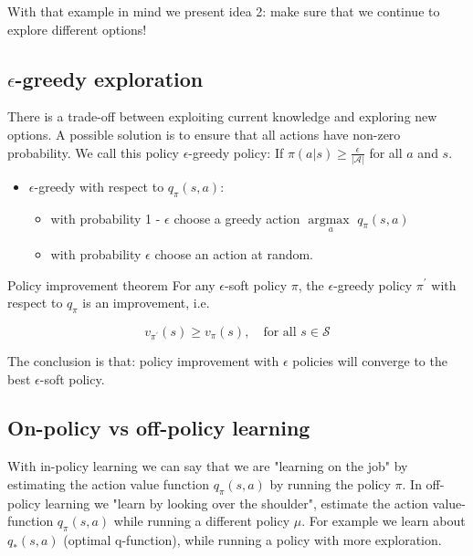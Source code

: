 With that example in mind we present idea 2: make sure that we continue to explore different options!

\subsection*{$\epsilon$-greedy exploration}
There is a trade-off between exploiting current knowledge and exploring new options. A possible solution is to ensure that all actions have non-zero probability. We call this policy $\epsilon$-greedy policy: If $\pi (a|s) \ge \frac{\epsilon} {|\mathcal{A}|} $ for all $a$ and $s$. 

\begin{itemize}
	\item $\epsilon$-greedy with respect to $q_\pi(s,a)$: 
	\begin{itemize}
		\item with probability 1 - $\epsilon$ choose a greedy action $\underset{a}{\arg \text{max }} q_\pi(s,a)$
		\item with probability $\epsilon$ choose an action at random.
	\end{itemize}
\end{itemize}

\begin{wbox}{Policy improvement theorem}
For any $\epsilon$-soft policy $\pi$, the $\epsilon$-greedy policy $\pi^{\prime}$ with respect to $q_\pi$ is an improvement, i.e.

	\begin{equation}
		v_{\pi^{\prime}}(s) \ge v_\pi(s), \quad \text{for all } s \in \mathcal{S}
	\end{equation}
\end{wbox}

The conclusion is that: policy improvement with $\epsilon$ policies will converge to the best $\epsilon$-soft policy. 

\subsection*{On-policy vs off-policy learning}
With in-policy learning we can say that we are "learning on the job" by estimating the action value function $q_\pi(s,a)$ by running the policy $\pi$. In off-policy learning we "learn by looking over the shoulder", estimate the action value-function $q_\pi(s,a)$ while running a different policy $\mu$. For example we learn about $q_*(s,a)$ (optimal q-function), while running a policy with more exploration.


